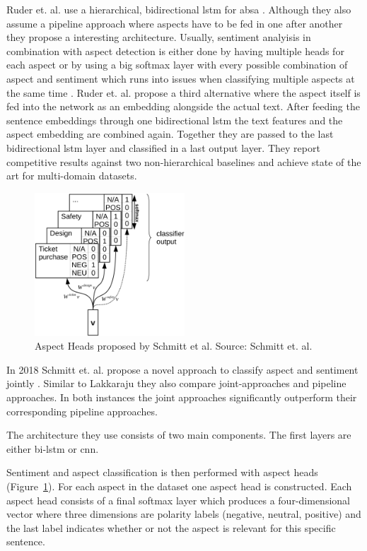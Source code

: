 Ruder et. al. use a hierarchical, bidirectional \gls{lstm} for \gls{absa} \cite{Ruder2016}. Although they also assume a pipeline approach where aspects have to be fed in one after another they propose a interesting architecture. Usually, sentiment analyisis in combination with aspect detection is either done by having multiple heads for each aspect \cite{Schmitt2018} or by using a big softmax layer with every possible combination of aspect and sentiment which runs into issues when classifying multiple aspects at the same time \cite{Lakkaraju2014}. Ruder et. al. propose a third alternative where the aspect itself is fed into the network as an embedding alongside the actual text. After feeding the sentence embeddings through one bidirectional \gls{lstm} the text features and the aspect embedding are combined again. Together they are passed to the last bidirectional \gls{lstm} layer and classified in a last output layer. They report competitive results against two non-hierarchical baselines and achieve state of the art for multi-domain datasets.
\medskip
\begin{figure}[htp]
	\centering
	\includegraphics[width=0.5\textwidth]{figures/02_relatedWork/02_jabsa}
	\caption{Aspect Heads proposed by Schmitt et al. Source: Schmitt et. al. \cite{Schmitt2018}}
	\label{fig:02_j-absa}
\end{figure}

In 2018 Schmitt et. al. propose a novel approach to classify aspect and sentiment jointly \cite{Schmitt2018}. Similar to Lakkaraju they also compare joint-approaches and pipeline approaches. In both instances the joint approaches significantly outperform their corresponding pipeline approaches. 

The architecture they use consists of two main components. The first layers are either bi-\gls{lstm} or \gls{cnn}. 

Sentiment and aspect classification is then performed with aspect heads {(Figure~\ref{fig:02_j-absa})}. For each aspect in the dataset one aspect head is constructed. Each aspect head consists of a final softmax layer which produces a four-dimensional vector where three dimensions are polarity labels {(negative, neutral, positive)} and the last label indicates whether or not the aspect is relevant for this specific sentence. 
\medskip

